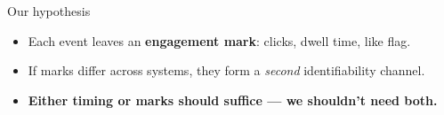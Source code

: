 \documentclass[aspectratio=169,11pt]{beamer}
\begin{document}
\begin{frame}{Our hypothesis}
  \vspace{0.5cm}

  \begin{center}
  \end{center}

  \vspace{0.5cm}

  \begin{itemize}\setlength{\itemsep}{0.2cm}
    \item Each event leaves an \textbf{engagement mark}: clicks, dwell time, like flag.
    \item If marks differ across systems, they form a \emph{second} identifiability channel.
    \item \textcolor{accent}{\bfseries Either timing or marks should suffice --- we shouldn't need both.}
  \end{itemize}
\end{frame}
\end{document}
